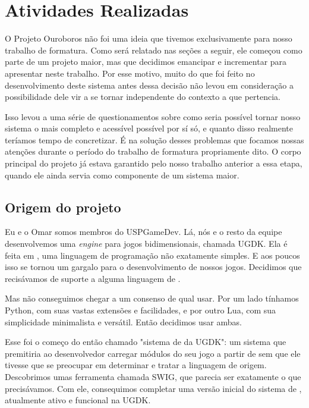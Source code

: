 \def\classname#1{\texttt{#1}}

\chapter{Atividades Realizadas}
\label{sec:atividades}

O Projeto Ouroboros não foi uma ideia que tivemos exclusivamente para nosso
trabalho de formatura. Como será relatado nas seções a seguir, ele começou como
parte de um projeto maior, mas que decidimos emancipar e incrementar para
apresentar neste trabalho. Por esse motivo, muito do que foi feito no
desenvolvimento deste sistema antes dessa decisão não levou em consideração a
possibilidade dele vir a se tornar independente do contexto a que pertencia.

Isso levou a uma série de questionamentos sobre como seria possível tornar nosso
sistema o mais completo e acessível possível por sí só, e quanto disso realmente
teríamos tempo de concretizar. É na solução desses problemas que focamos nossas
atenções durante o período do trabalho de formatura propriamente dito. O corpo
principal do projeto já estava garantido pelo nosso trabalho anterior a essa
etapa, quando ele ainda servia como componente de um sistema maior.

\section{Origem do projeto}
\label{sec:atividades:origem}

Eu e o Omar somos membros do USPGameDev. Lá, nós e o resto da equipe
desenvolvemos uma \emph{engine} para jogos bidimensionais, chamada UGDK. Ela é
feita em \cxx{}, uma linguagem de programação não exatamente simples. E aos
poucos isso se tornou um gargalo para o desenvolvimento de nossos jogos.
Decidimos que recisávamos de suporte a alguma linguagem de \script{}.

Mas não conseguimos chegar a um consenso de qual usar. Por um lado tínhamos
Python, com suas vastas extensões e facilidades, e por outro Lua, com sua
simplicidade minimalista e versátil. Então decidimos usar ambas.

Esse foi o começo do então chamado "sistema de \script{} da UGDK": um sistema
que premitiria ao desenvolvedor carregar módulos do seu jogo a partir de
\script{} sem que ele tivesse que se preocupar em determinar e tratar a
linguagem de origem. Descobrimos umas ferramenta chamada SWIG, que parecia ser
exatamente o que precisávamos. Com ele, consequimos completar uma versão inicial
do sistema de \script{}, atualmente ativo e funcional na UGDK.

